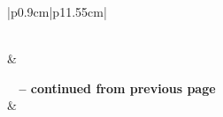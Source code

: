 \documentclass[11pt]{report}
\begin{document}
\begin{longtable}{|p{0.9cm}|p{11.55cm}|}
\caption[The functional requirements of Roslyn]{The functional requirements of Roslyn} 
\label{table:functional-requirements} \\

\hline {} &  \\ \hline 
\endfirsthead

%
{{\bfseries \tablename\ \thetable{} -- continued from previous page}} \\
\hline {} &  \\ \hline 
\endhead

 \\ \hline
\endfoot

\endlastfoot


\end{longtable}
\end{document}
